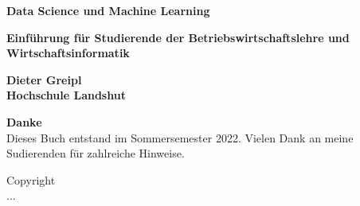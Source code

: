 
\begin{titlepage}

\begin{center}

\Huge \textbf{Data Science und Machine Learning}

\Large \textbf{Einführung für Studierende der Betriebswirtschaftslehre und Wirtschaftsinformatik}


\end{center}

\noindent{}

\vspace{-3cm}
\hfill
\begin{minipage}[b][1cm][t]{10cm}
  \color{white}
  \begin{flushright}
     \Huge\textbf{Dieter Greipl}\\
     \Large\textbf{Hochschule Landshut}\\
  \end{flushright}
\end{minipage}

\end{titlepage}

\begin{titlepage}
\hfill
\begin{minipage}[r][10cm][t]{10cm}
\large \textbf{Danke}\\
	Dieses Buch entstand im Sommersemester 2022. Vielen Dank an meine Sudierenden für zahlreiche Hinweise.
\end{minipage}

\vfill
\begin{minipage}[b][10cm][b]{10cm}
\large{Copyright}\\
	...
\end{minipage}

\end{titlepage}

